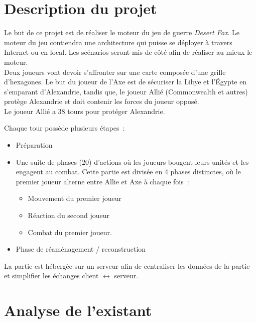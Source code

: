 \section{Description du projet}

Le but de ce projet est de réaliser le moteur du jeu de guerre \emph{Desert Fox}.
Le moteur du jeu contiendra une architecture qui puisse se déployer à travers Internet ou en local.
Les scénarios seront mis de côté afin de réaliser au mieux le moteur.\\

Deux joueurs vont devoir s'affronter sur une carte composée d'une grille d'hexagones.
Le but du joueur de l'Axe est de sécuriser la Libye et l'Égypte en s'emparant d'Alexandrie, tandis que, le joueur Allié (Commonwealth et autres) protège Alexandrie et doit contenir les forces du joueur opposé.\\
Le joueur Allié a 38 tours pour protéger Alexandrie.

Chaque tour possède plusieurs étapes :
\begin{itemize}
    \item Préparation
    \item Une suite de phases (20) d'actions où les joueurs bougent leurs unités et les engagent au combat.
          Cette partie est divisée en 4 phases distinctes, où le premier joueur alterne entre Allie et Axe à chaque fois :
          \begin{itemize}
              \item Mouvement du premier joueur
              \item Réaction du second joueur
              \item Combat du premier joueur.
          \end{itemize}
    \item Phase de réaménagement / reconstruction
\end{itemize}


La partie est hébergée sur un serveur afin de centraliser les données de la partie et simplifier les échanges client $\leftrightarrow$ serveur.

\section{Analyse de l'existant}


